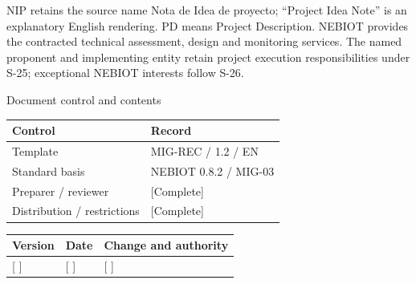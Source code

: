 \vspace{2mm}
NIP retains the source name Nota de Idea de proyecto; “Project Idea Note” is an explanatory English rendering. PD means Project Description.
\vspace{2mm}
NEBIOT provides the contracted technical assessment, design and monitoring services. The named proponent and implementing entity retain project execution responsibilities under S-25; exceptional NEBIOT interests follow S-26.
\clearpage
{\fontsize{23}{27}\selectfont\color{NEBGreen}Document control and contents\par}
\vspace{3mm}
{\sffamily\fontsize{8.3}{10.3}\selectfont\begin{longtable}{@{}P{50.55mm} P{117.94mm}@{}}
\toprule
\textbf{Control} & \textbf{Record}\\\midrule\endhead
\rule{0pt}{7.7mm}Template & MIG-REC / 1.2 / EN\\\hline
\rule{0pt}{7.7mm}Standard basis & NEBIOT 0.8.2 / MIG-03\\\hline
\rule{0pt}{7.7mm}Preparer / reviewer & [Complete]\\\hline
\rule{0pt}{7.7mm}Distribution / restrictions & [Complete]\\\hline
\end{longtable}}
{\sffamily\fontsize{8.3}{10.3}\selectfont\begin{longtable}{@{}P{31.34mm} P{37.94mm} P{95.68mm}@{}}
\toprule
\textbf{Version} & \textbf{Date} & \textbf{Change and authority}\\\midrule\endhead
\rule{0pt}{7.7mm}[ ] & [ ] & [ ]\\\hline
\end{longtable}}
{\sffamily\fontsize{9.5}{11.4}\selectfont\tableofcontents}

